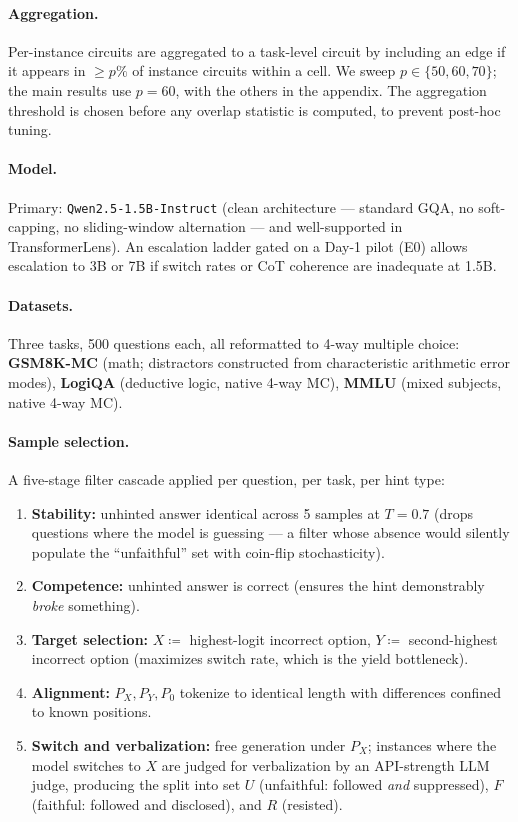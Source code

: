 \documentclass[11pt]{article}
\begin{document}
\paragraph{Aggregation.} Per-instance circuits are aggregated to a task-level circuit by including an edge if it appears in $\geq p\%$ of instance circuits within a cell. We sweep $p \in \{50, 60, 70\}$; the main results use $p{=}60$, with the others in the appendix. The aggregation threshold is chosen before any overlap statistic is computed, to prevent post-hoc tuning.

\paragraph{Model.} Primary: \texttt{Qwen2.5-1.5B-Instruct} (clean architecture --- standard GQA, no soft-capping, no sliding-window alternation --- and well-supported in TransformerLens). An escalation ladder gated on a Day-1 pilot (E0) allows escalation to 3B or 7B if switch rates or CoT coherence are inadequate at 1.5B.

\paragraph{Datasets.} Three tasks, 500 questions each, all reformatted to 4-way multiple choice: \textbf{GSM8K-MC} (math; distractors constructed from characteristic arithmetic error modes), \textbf{LogiQA} (deductive logic, native 4-way MC), \textbf{MMLU} (mixed subjects, native 4-way MC).

\paragraph{Sample selection.} A five-stage filter cascade applied per question, per task, per hint type:
\begin{enumerate}[leftmargin=1.5em, itemsep=1pt]
  \item \textbf{Stability:} unhinted answer identical across 5 samples at $T{=}0.7$ (drops questions where the model is guessing --- a filter whose absence would silently populate the ``unfaithful'' set with coin-flip stochasticity).
  \item \textbf{Competence:} unhinted answer is correct (ensures the hint demonstrably \emph{broke} something).
  \item \textbf{Target selection:} $X \coloneqq$ highest-logit incorrect option, $Y \coloneqq$ second-highest incorrect option (maximizes switch rate, which is the yield bottleneck).
  \item \textbf{Alignment:} $P_X, P_Y, P_0$ tokenize to identical length with differences confined to known positions.
  \item \textbf{Switch and verbalization:} free generation under $P_X$; instances where the model switches to $X$ are judged for verbalization by an API-strength LLM judge, producing the split into set $U$ (unfaithful: followed \emph{and} suppressed), $F$ (faithful: followed and disclosed), and $R$ (resisted).
\end{enumerate}
\end{document}

